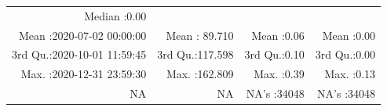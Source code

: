 \documentclass[
  10pt,
  a4paper,oneside]{article}
\begin{document}
\begin{longtable}[]{@{}rrrr@{}}
\begin{minipage}[t]{0.17\columnwidth}
Median :0.00\strut
\end{minipage}\tabularnewline
\begin{minipage}[t]{0.34\columnwidth}\raggedleft
Mean :2020-07-02 00:00:00\strut
\end{minipage} & \begin{minipage}[t]{0.20\columnwidth}\raggedleft
Mean : 89.710\strut
\end{minipage} & \begin{minipage}[t]{0.17\columnwidth}\raggedleft
Mean :0.06\strut
\end{minipage} & \begin{minipage}[t]{0.17\columnwidth}\raggedleft
Mean :0.00\strut
\end{minipage}\tabularnewline
\begin{minipage}[t]{0.34\columnwidth}\raggedleft
3rd Qu.:2020-10-01 11:59:45\strut
\end{minipage} & \begin{minipage}[t]{0.20\columnwidth}\raggedleft
3rd Qu.:117.598\strut
\end{minipage} & \begin{minipage}[t]{0.17\columnwidth}\raggedleft
3rd Qu.:0.10\strut
\end{minipage} & \begin{minipage}[t]{0.17\columnwidth}\raggedleft
3rd Qu.:0.00\strut
\end{minipage}\tabularnewline
\begin{minipage}[t]{0.34\columnwidth}\raggedleft
Max. :2020-12-31 23:59:30\strut
\end{minipage} & \begin{minipage}[t]{0.20\columnwidth}\raggedleft
Max. :162.809\strut
\end{minipage} & \begin{minipage}[t]{0.17\columnwidth}\raggedleft
Max. :0.39\strut
\end{minipage} & \begin{minipage}[t]{0.17\columnwidth}\raggedleft
Max. :0.13\strut
\end{minipage}\tabularnewline
\begin{minipage}[t]{0.34\columnwidth}\raggedleft
NA\strut
\end{minipage} & \begin{minipage}[t]{0.20\columnwidth}\raggedleft
NA\strut
\end{minipage} & \begin{minipage}[t]{0.17\columnwidth}\raggedleft
NA's :34048\strut
\end{minipage} & \begin{minipage}[t]{0.17\columnwidth}\raggedleft
NA's :34048\strut
\end{minipage}\tabularnewline
\bottomrule
\end{longtable}
\end{document}
